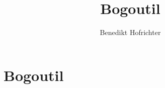 \documentclass{article}
\begin{document}
\title{Bogoutil}
\author{Benedikt Hofrichter}
\maketitle

\section{Bogoutil}








\end{document}
